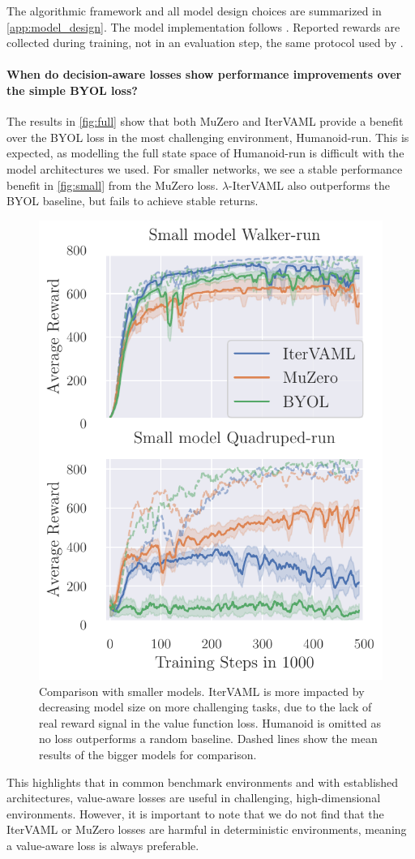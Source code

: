 The algorithmic framework and all model design choices are summarized in \autoref{app:model_design}.
The model implementation follows \textcite{tdmpc}. 
Reported rewards are collected during training, not in an evaluation step, the same protocol used by \textcite{tdmpc}.


\paragraph{When do decision-aware losses show performance improvements over the simple BYOL loss?}
The results in \autoref{fig:full} show that both MuZero and IterVAML provide a benefit over the BYOL loss in the most challenging environment, Humanoid-run.
This is expected, as modelling the full state space of Humanoid-run is difficult with the model architectures we used.
For smaller networks, we see a stable performance benefit in \autoref{fig:small} from the MuZero loss.
$\lambda$-IterVAML also outperforms the BYOL baseline, but fails to achieve stable returns.

\begin{figure}
    \centering
    \includegraphics[width=.35\textwidth]{figures/lambda/small_2.pdf}
    \caption{Comparison with smaller models. IterVAML is more impacted by decreasing model size on more challenging tasks, due to the lack of real reward signal in the value function loss. Humanoid is omitted as no loss outperforms a random baseline. Dashed lines show the mean results of the bigger models for comparison.}
    \label{fig:small}
\end{figure}

This highlights that in common benchmark environments and with established architectures, value-aware losses are useful in challenging, high-dimensional environments.
However, it is important to note that we do not find that the IterVAML or MuZero losses are harmful in deterministic environments, meaning a value-aware loss is always preferable.


